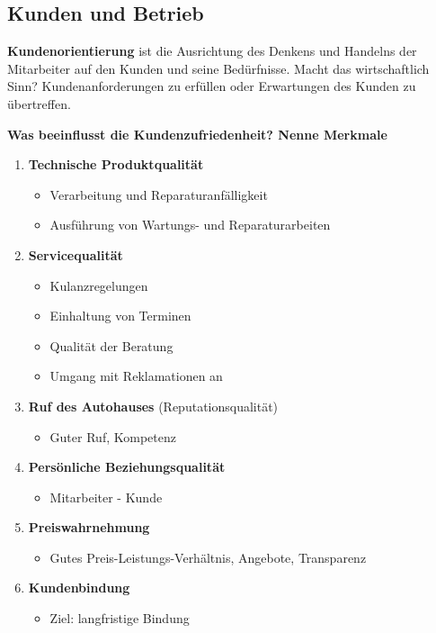 \newpage

\subsection{Kunden und Betrieb}\label{kunden-und-betrieb}

\textbf{Kundenorientierung} ist die Ausrichtung des Denkens und Handelns
der Mitarbeiter auf den Kunden und seine Bedürfnisse. Macht das
wirtschaftlich Sinn? Kundenanforderungen zu erfüllen oder Erwartungen
des Kunden zu übertreffen.

\textbf{Was beeinflusst die Kundenzufriedenheit? Nenne Merkmale}

\begin{enumerate}
\item
  \textbf{Technische Produktqualität}

  \begin{itemize}
  \item
    Verarbeitung und Reparaturanfälligkeit
  \item
    Ausführung von Wartungs- und Reparaturarbeiten
  \end{itemize}
\item
  \textbf{Servicequalität}

  \begin{itemize}
  \item
    Kulanzregelungen
  \item
    Einhaltung von Terminen
  \item
    Qualität der Beratung
  \item
    Umgang mit Reklamationen an
  \end{itemize}
\item
  \textbf{Ruf des Autohauses} (Reputationsqualität)

  \begin{itemize}
  \item
    Guter Ruf, Kompetenz
  \end{itemize}
\item
  \textbf{Persönliche Beziehungsqualität}

  \begin{itemize}
  \item
    Mitarbeiter - Kunde
  \end{itemize}
\item
  \textbf{Preiswahrnehmung}

  \begin{itemize}
  \item
    Gutes Preis-Leistungs-Verhältnis, Angebote, Transparenz
  \end{itemize}
\item
  \textbf{Kundenbindung}

  \begin{itemize}
  \item
    Ziel: langfristige Bindung
  \end{itemize}
\end{enumerate}

